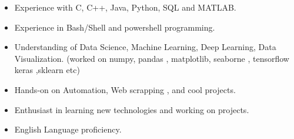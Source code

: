\documentclass[10pt,a4paper,ragged2e,withhyper]{altacv}
\begin{document}
\begin{paracol}{2}
\begin{itemize}
\item Experience with C, C++, Java, Python, SQL and MATLAB.
\item Experience in Bash/Shell and powershell programming.
\item Understanding of Data Science, Machine Learning, Deep Learning, Data Visualization. (worked on numpy, pandas , matplotlib, seaborne , tensorflow keras ,sklearn etc)
\item Hands-on on Automation, Web scrapping , and cool projects.
\item Enthusiast in learning new technologies and working on projects. 
\item English Language proficiency.
\end{itemize}

\divider
{}



\divider\smallskip

\end{paracol}
\end{document}
